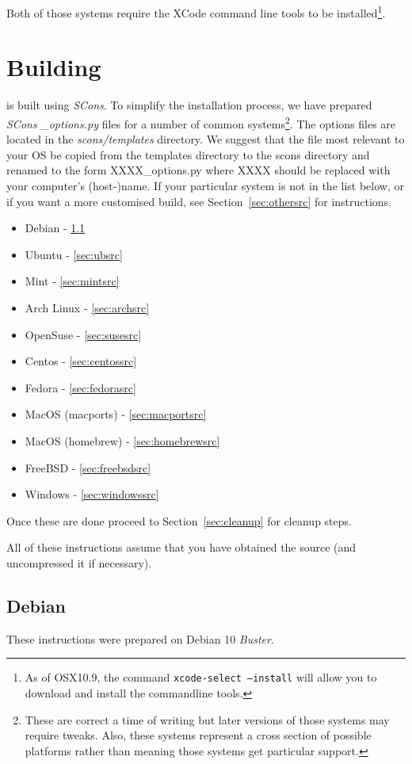 \noindent Both of those systems require the XCode command line tools to be installed\footnote{As of OSX10.9, the
command \texttt{xcode-select --install} will allow you to download and install the commandline tools.}.

\section{Building}\label{sec:build}

\esfinley is built using \textit{SCons}. To simplify the installation process, we have prepared \textit{SCons} \textit{_options.py} files for a number of common systems\footnote{These are correct a time of writing but later versions of those systems may require tweaks.
Also, these systems represent a cross section of possible platforms rather than meaning those systems get particular support.}.
The options files are located in the \textit{scons/templates} directory. We suggest that the file most relevant to your OS
be copied from the templates directory to the scons directory and renamed to the form XXXX_options.py where XXXX
should be replaced with your computer's (host-)name.
If your particular system is not in the list below, or if you want a more customised
build,
see Section~\ref{sec:othersrc} for instructions.
\begin{itemize}
 \item Debian - \ref{sec:debsrc}
 \item Ubuntu - \ref{sec:ubsrc}
 \item Mint - \ref{sec:mintsrc}
 \item Arch Linux - \ref{sec:archsrc}
 \item OpenSuse - \ref{sec:susesrc}
 \item Centos - \ref{sec:centossrc}
 \item Fedora - \ref{sec:fedorasrc}
 \item MacOS (macports) - \ref{sec:macportsrc}
 \item MacOS (homebrew) - \ref{sec:homebrewsrc}
 \item FreeBSD - \ref{sec:freebsdsrc}
 \item Windows - \ref{sec:windowssrc}
\end{itemize}

Once these are done proceed to Section~\ref{sec:cleanup} for cleanup steps.

\noindent All of these instructions assume that you have obtained the \escript source (and uncompressed it if necessary).
\subsection{Debian}\label{sec:debsrc}
\noindent These instructions were prepared on Debian 10 \textit{Buster}.

